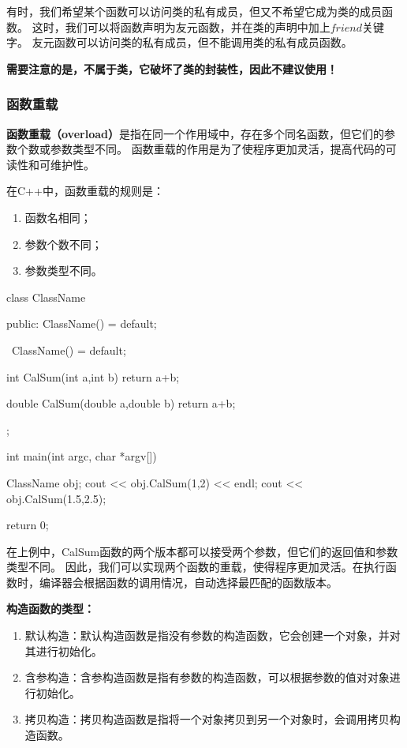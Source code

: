 有时，我们希望某个函数可以访问类的私有成员，但又不希望它成为类的成员函数。
这时，我们可以将函数声明为友元函数，并在类的声明中加上$friend$关键字。
友元函数可以访问类的私有成员，但不能调用类的私有成员函数。

\textbf{需要注意的是，不属于类，它破坏了类的封装性，因此不建议使用！}

\subsubsection{函数重载}
\textbf{函数重载（overload）}是指在同一个作用域中，存在多个同名函数，但它们的参数个数或参数类型不同。
函数重载的作用是为了使程序更加灵活，提高代码的可读性和可维护性。

在C++中，函数重载的规则是：
\begin{enumerate}
    \item 函数名相同；
    \item 参数个数不同；
    \item 参数类型不同。
\end{enumerate}

\begin{tcode}
class ClassName {
public:
    ClassName() = default;

    ~ClassName() = default;

    int CalSum(int a,int b){
        return a+b;
    }

    double CalSum(double a,double b){
        return a+b;
    }
};

int main(int argc, char *argv[]) {
    ClassName obj;
    cout << obj.CalSum(1,2) << endl;
    cout <<  obj.CalSum(1.5,2.5);

    return 0;
}
\end{tcode}

在上例中，CalSum函数的两个版本都可以接受两个参数，但它们的返回值和参数类型不同。
因此，我们可以实现两个函数的重载，使得程序更加灵活。在执行函数时，编译器会根据函数的调用情况，自动选择最匹配的函数版本。

\textbf{构造函数的类型：}

\begin{enumerate}
    \item 默认构造：默认构造函数是指没有参数的构造函数，它会创建一个对象，并对其进行初始化。
    \item 含参构造：含参构造函数是指有参数的构造函数，可以根据参数的值对对象进行初始化。
    \item 拷贝构造：拷贝构造函数是指将一个对象拷贝到另一个对象时，会调用拷贝构造函数。
\end{enumerate}

